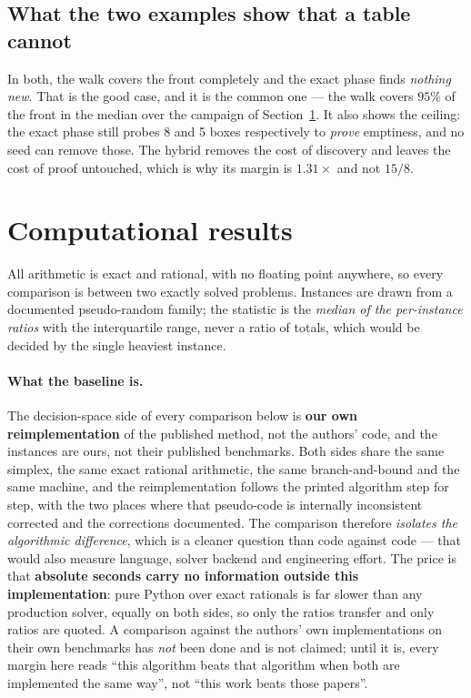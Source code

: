 \documentclass[11pt,a4paper]{article}
\begin{document}
\subsection{What the two examples show that a table cannot}

In both, the walk covers the front completely and the exact phase finds
\emph{nothing new}.  That is the good case, and it is the common one --- the
walk covers $95\%$ of the front in the median over the campaign of
Section~\ref{sec:results}.  It also shows the ceiling: the exact phase still
probes 8 and 5 boxes respectively to \emph{prove} emptiness, and no seed can
remove those.  The hybrid removes the cost of discovery and leaves the cost of
proof untouched, which is why its margin is $1.31\times$ and not $15/8$.

\section{Computational results}
\label{sec:results}

All arithmetic is exact and rational, with no floating point anywhere, so every
comparison is between two exactly solved problems.  Instances are drawn from a
documented pseudo-random family; the statistic is the \emph{median of the
per-instance ratios} with the interquartile range, never a ratio of totals,
which would be decided by the single heaviest instance.

\paragraph{What the baseline is.}
The decision-space side of every comparison below is \textbf{our own
reimplementation} of the published method, not the authors' code, and the
instances are ours, not their published benchmarks.  Both sides share the same
simplex, the same exact rational arithmetic, the same branch-and-bound and the
same machine, and the reimplementation follows the printed algorithm step for
step, with the two places where that pseudo-code is internally inconsistent
corrected and the corrections documented.  The comparison therefore
\emph{isolates the algorithmic difference}, which is a cleaner question than
code against code --- that would also measure language, solver backend and
engineering effort.  The price is that \textbf{absolute seconds carry no
information outside this implementation}: pure Python over exact rationals is
far slower than any production solver, equally on both sides, so only the
ratios transfer and only ratios are quoted.  A comparison against the authors'
own implementations on their own benchmarks has \emph{not} been done and is not
claimed; until it is, every margin here reads ``this algorithm beats that
algorithm when both are implemented the same way'', not ``this work beats those
papers''.
\end{document}
